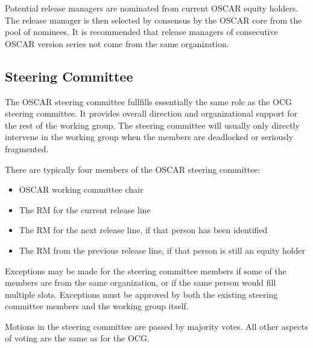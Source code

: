 Potential release managers are nominated from current OSCAR equity
holders.  The release manager is then selected by consensus by the
OSCAR core from the pool of nominees.  It is recommended that release
managers of consecutive OSCAR version series not come from the same
organization. 


\subsection{Steering Committee}

The OSCAR steering committee fullfills essentially the same role as
the OCG steering committee.  It provides overall direction and
organizational support for the rest of the working group.  The
steering committee will usually only directly intervene in the working
group when the members are deadlocked or seriously fragmented. 

There are typically four members of the OSCAR steering committee:

\begin{itemize}
\item OSCAR working committee chair
\item The RM for the current release line
\item The RM for the next release line, if that person has been
  identified
\item The RM from the previous release line, if that person is still
  an equity holder
\end{itemize}

Exceptions may be made for the steering committee members if some of
the members are from the same organization, or if the same person
would fill multiple slots.  Exceptions must be approved by both the
existing steering committee members and the working group itself.

Motions in the steering committee are passed by majority votes.  All
other aspects of voting are the same as for the OCG.

